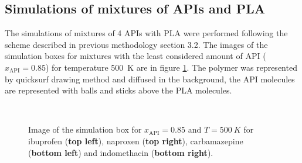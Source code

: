 \subsection{Simulations of mixtures of APIs and PLA}
The simulations of mixtures of 4 APIs with PLA were performed following the scheme described in previous methodology section 3.2. The images of the simulation boxes for mixtures with the least considered amount of API ($x_{\text{API}}=0.85$) for temperature 500~K are in figure \ref{fig:mix_boxes}. The polymer was represented by quicksurf drawing method and diffused in the background, the API molecules are represented with balls and sticks above the PLA molecules.

\begin{figure}[htb!]
	\centering
	\hspace{0.2cm}
	\\
	\vspace{0.2cm}
	\hspace{0.2cm}
	\caption{Image of the simulation box for $x_{\text{API}}=0.85$ and $T=500~K$ for ibuprofen (\textbf{top left}), naproxen (\textbf{top right}), carbamazepine (\textbf{bottom left}) and indomethacin (\textbf{bottom right}).}
	\label{fig:mix_boxes}
\end{figure}
\vspace{-0.5cm}
